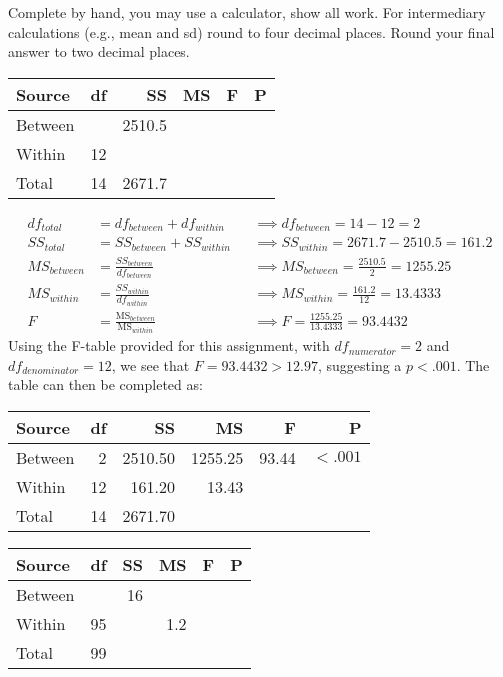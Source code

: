 \documentclass[onecolumn,10pt]{jhwhw}
\begin{document}
\problem{}
Complete by hand, you may use a calculator, show all work. For intermediary calculations (e.g., mean and sd) round to four decimal places. Round your final answer to two decimal places.

\begin{center}
\begin{tabular}{l r r r r r}
\toprule
Source & df & SS & MS & F & P \\
\midrule
Between &    & 2510.5 & & & \\
Within  & 12 &        & & & \\
Total   & 14 & 2671.7 & & & \\
\bottomrule
\end{tabular}
\end{center}

\begin{align*}
df_{total} &= df_{between} + df_{within} && \implies df_{between} = 14-12 = 2\\
SS_{total} &= SS_{between} + SS_{within} && \implies SS_{within} = 2671.7-2510.5=161.2\\
MS_{between} &= \frac{SS_{between}}{df_{between}} && \implies MS_{between} = \frac{2510.5}{2} = 1255.25 \\
MS_{within}  &= \frac{SS_{within}}{df_{within}}   && \implies MS_{within}  = \frac{161.2}{12} = 13.4333 \\
F &= \frac{\mbox{MS}_{between}}{\mbox{MS}_{within}} && \implies F = \frac{1255.25}{13.4333} = 93.4432
\end{align*}
Using the F-table provided for this assignment, with $df_{numerator} = 2$ and $df_{denominator} = 12$, we see that $F = 93.4432 > 12.97$, suggesting a $p < .001$. The table can then be completed as:

\begin{center}
\begin{tabular}{l r r r r r}
\toprule
Source & df & SS & MS & F & P \\
\midrule
Between &  2 & 2510.50 & 1255.25 & 93.44 & $<.001$ \\
Within  & 12 &  161.20 & 13.43 & & \\
Total   & 14 & 2671.70 & & & \\
\bottomrule
\end{tabular}
\end{center}

\problem{}
\begin{center}
\begin{tabular}{l r r r r r}
\toprule
Source & df & SS & MS & F & P \\
\midrule
Between &    & 16 &     & & \\
Within  & 95 &    & 1.2 & & \\
Total   & 99 &    &     & & \\
\bottomrule
\end{tabular}
\end{center}
\end{document}
